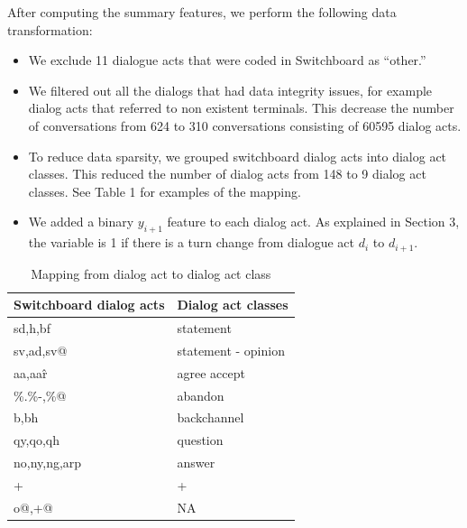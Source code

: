    After computing the summary features, we perform the following data transformation:
    \begin{itemize}[leftmargin=1em]
    \item We exclude 11 dialogue acts that were coded in Switchboard as ``other.''
    \item We filtered out all the dialogs that had data integrity issues,  for example
          dialog acts that referred to non existent terminals. This decrease the number
          of conversations from 624 to 310 conversations consisting of 60595 dialog acts.
    \item To reduce data sparsity, we grouped switchboard dialog acts into dialog act classes. This reduced the number of dialog acts from 148 to 9 dialog act classes. See Table 1 for examples of the mapping.
    \item We added a binary $y_{i+1}$ feature to each dialog act. As explained in Section 3, the variable is 1 if there is a turn change from dialogue act $d_i$ to $d_{i+1}$.

    \end{itemize}
    \begin{table}
     \begin{center}
    \begin{tabular}{ |p{2cm}||p{3cm} | }
    \hline
Switchboard dialog acts &  Dialog act classes  \\
    \hline
sd,h,bf      & statement   \\
sv,ad,sv@    & statement - opinion  \\
aa,aa\^r     & agree accept \\
\%.\%-,\%@   & abandon      \\
b,bh         & backchannel  \\
qy,qo,qh     & question     \\
no,ny,ng,arp & answer       \\
+            & +            \\
o@,+@        & NA           \\
  \hline
\end{tabular}
\end{center}\vspace{-0.5em}
\caption{Mapping from dialog act to dialog act class}
\label{tab:mapping}
\end{table}
